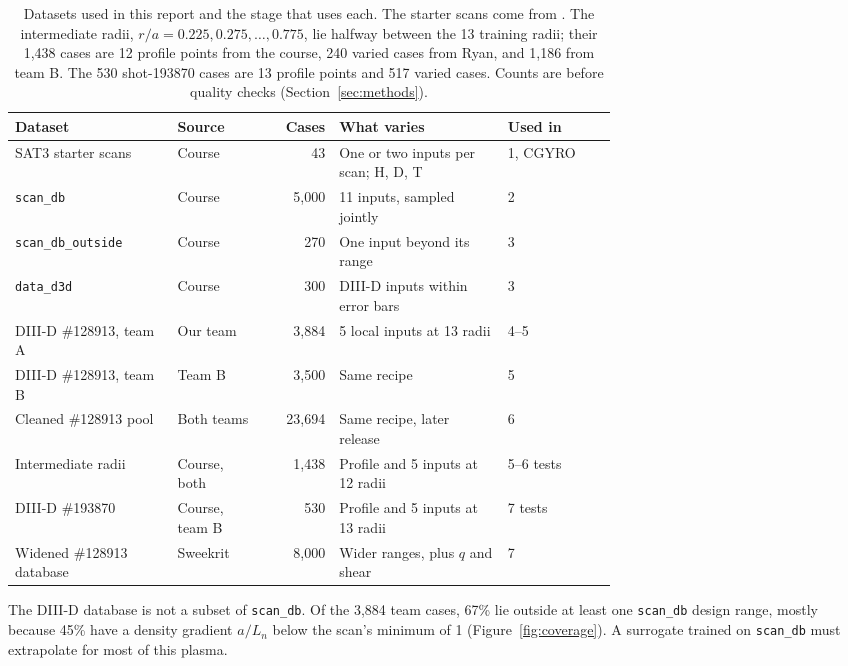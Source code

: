 \documentclass[12pt,letterpaper]{article}
\begin{document}
\begin{table}[tbp]
  \centering
  \footnotesize
  \setlength{\tabcolsep}{4pt}
  \begin{tabular}{@{}p{0.27\linewidth}p{0.15\linewidth}rp{0.28\linewidth}l@{}}
    \toprule
    Dataset & Source & Cases & What varies & Used in \\
    \midrule
    SAT3 starter scans & Course & 43 & One or two inputs per scan; H, D, T & 1, CGYRO \\
    \texttt{scan\_db} & Course & 5,000 & 11 inputs, sampled jointly & 2 \\
    \texttt{scan\_db\_outside} & Course & 270 & One input beyond its range & 3 \\
    \texttt{data\_d3d} & Course & 300 & DIII-D inputs within error bars & 3 \\
    \midrule
    DIII-D \#128913, team A & Our team & 3,884 & 5 local inputs at 13 radii & 4--5 \\
    DIII-D \#128913, team B & Team B & 3,500 & Same recipe & 5 \\
    Cleaned \#128913 pool & Both teams & 23,694 & Same recipe, later release & 6 \\
    Intermediate radii & Course, both & 1,438 & Profile and 5 inputs at 12 radii & 5--6 tests \\
    DIII-D \#193870 & Course, team B & 530 & Profile and 5 inputs at 13 radii & 7 tests \\
    Widened \#128913 database & Sweekrit & 8,000 & Wider ranges, plus $q$ and shear & 7 \\
    \bottomrule
  \end{tabular}
  \caption{Datasets used in this report and the stage that uses each. The starter scans
    come from \citet{dudding2022}. The intermediate radii, $r/a = 0.225, 0.275, \dots, 0.775$,
    lie halfway between the 13 training radii; their 1,438 cases are 12 profile points from
    the course, 240 varied cases from Ryan, and 1,186 from team B. The 530 shot-193870 cases
    are 13 profile points and 517 varied cases. Counts are before quality checks
    (Section~\ref{sec:methods}).}
  \label{tab:data}
\end{table}

The DIII-D database is not a subset of \texttt{scan\_db}. Of the 3,884 team cases, 67\% lie
outside at least one \texttt{scan\_db} design range, mostly because 45\% have a density
gradient $a/L_n$ below the scan's minimum of 1 (Figure~\ref{fig:coverage}). A surrogate
trained on \texttt{scan\_db} must extrapolate for most of this plasma.
\end{document}
